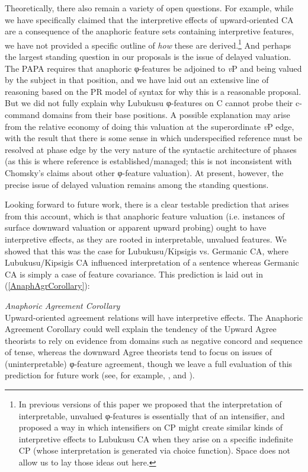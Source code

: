 \documentclass[output=paper
,modfonts
,nonflat
]{langsci/langscibook}
\begin{document}
Theoretically, there also remain a variety of open questions. For example, while we have specifically claimed that the interpretive effects of upward-oriented CA are a consequence of the anaphoric feature sets containing interpretive features, we have not provided a specific outline of \textit{how} these are derived.{\footnote{In previous versions of this paper we proposed that the interpretation of interpretable, unvalued φ-features is essentially that of an intensifier, and proposed a way in which intensifiers on CP might create similar kinds of interpretive effects to Lubukusu CA when they arise on a specific indefinite CP (whose interpretation is generated via choice function). Space does not allow us to lay those ideas out here.}} And perhaps the largest standing question in our proposals is the issue of delayed valuation. The PAPA requires that anaphoric φ-features be adjoined to \textit{v}P and being valued by the subject in that position, and we have laid out an extensive line of reasoning based on the PR model of syntax for why this is a reasonable proposal. But we did not fully explain why Lubukusu φ-features on C cannot probe their c-command domains from their base positions. A possible explanation may arise from the relative economy of doing this valuation at the superordinate \textit{v}P edge, with the result that there is some sense in which underspecified reference must be resolved at phase edge by the very nature of the syntactic architecture of phases (as this is where reference is established/managed; this is not inconsistent with Chomsky's \citeyear{Chomsky2008} claims about other  φ-feature valuation). At present, however, the precise issue of delayed valuation remains among the standing questions. 

Looking forward to future work, there is a clear testable prediction that arises from this account, which is that anaphoric feature valuation (i.e. instances of surface downward valuation or apparent upward probing) ought to have interpretive effects, as they are rooted in interpretable, unvalued features. We showed that this was the case for Lubukusu/Kipsigis vs. Germanic CA, where Lubukusu/Kipsigis CA influenced interpretation of a sentence whereas Germanic CA is simply a case of feature covariance. This prediction is laid out in (\ref{AnaphAgrCorollary}): 

\ea \label{AnaphAgrCorollary}
\textit{Anaphoric Agreement Corollary} \\
Upward-oriented agreement relations will have interpretive effects.
\z
\noindent The Anaphoric Agreement Corollary could well explain the tendency of the Upward Agree theorists to rely on evidence from domains such as negative concord and sequence of tense, whereas the downward Agree theorists tend to focus on issues of (uninterpretable)  φ-feature agreement, though we leave a full evaluation of this prediction for future work (see, for example, \citealt{Bjorkman:toappearb}, and \citealt{Preminger:2013}).\largerpage
\end{document}
